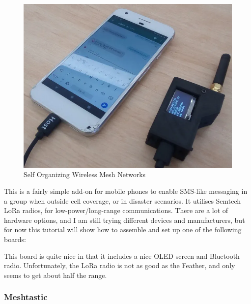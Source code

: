 				\noindent
				\begin{minipage}{0.48\textwidth}%
					\begin{figure}[H]
						\centering
						\includegraphics[width=\textwidth]{resources/img/chap4/lora-mesh-chat-5267d9}
						\caption[Self Organizing Wireless Mesh Networks]{Self Organizing Wireless Mesh Networks\cite{BADIS2015653}}
						\label{img:wms_microsoft}
					\end{figure}
				\end{minipage}%
				\hfill%
				\begin{minipage}{0.5\textwidth}\raggedright
					This is a fairly simple add-on for mobile phones to enable SMS-like messaging in a group when outside cell coverage, or in disaster scenarios. It utilises Semtech LoRa radios, for low-power/long-range communications. There are a lot of hardware options, and I am still trying different devices and manufacturers, but for now this tutorial will show how to assemble and set up one of the following boards:
					
					This board is quite nice in that it includes a nice OLED screen and Bluetooth radio. Unfortunately, the LoRa radio is not as good as the Feather, and only seems to get about half the range.
				\end{minipage}
			
				
				\subsubsection{Meshtastic}		
	
